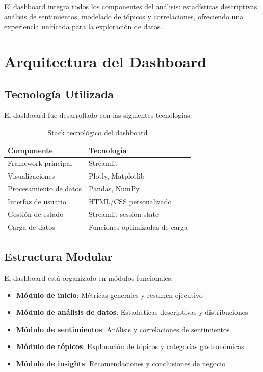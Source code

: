 \documentclass[12pt,a4paper,twoside,openany]{book}
\begin{document}
El dashboard integra todos los componentes del análisis: estadísticas descriptivas, análisis de sentimientos, modelado de tópicos y correlaciones, ofreciendo una experiencia unificada para la exploración de datos.

\section{Arquitectura del Dashboard}

\subsection{Tecnología Utilizada}

El dashboard fue desarrollado con las siguientes tecnologías:

\begin{table}[H]
\centering
\caption{Stack tecnológico del dashboard}
\begin{tabular}{@{}ll@{}}
\toprule
\textbf{Componente} & \textbf{Tecnología} \\
\midrule
Framework principal & Streamlit \\
Visualizaciones & Plotly, Matplotlib \\
Procesamiento de datos & Pandas, NumPy \\
Interfaz de usuario & HTML/CSS personalizado \\
Gestión de estado & Streamlit session state \\
Carga de datos & Funciones optimizadas de carga \\
\bottomrule
\end{tabular}
\end{table}

\subsection{Estructura Modular}

El dashboard está organizado en módulos funcionales:

\begin{itemize}
    \item \textbf{Módulo de inicio}: Métricas generales y resumen ejecutivo
    \item \textbf{Módulo de análisis de datos}: Estadísticas descriptivas y distribuciones
    \item \textbf{Módulo de sentimientos}: Análisis y correlaciones de sentimientos
    \item \textbf{Módulo de tópicos}: Exploración de tópicos y categorías gastronómicas
    \item \textbf{Módulo de insights}: Recomendaciones y conclusiones de negocio
\end{itemize}
\end{document}
